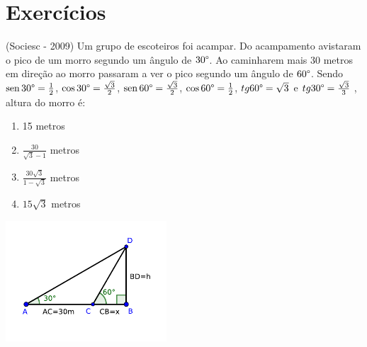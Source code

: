  \section{Exercícios}
 \begin{exer}
 (Sociesc - 2009) Um grupo de escoteiros foi acampar. Do acampamento avistaram o pico de um morro segundo um ângulo de $30 \degree$. Ao caminharem mais 30 metros em direção ao morro passaram a ver o pico segundo um ângulo de $60 \degree$. Sendo $\operatorname{sen} 30\degree = \frac{1}{2}$, $\cos 30\degree =\frac{\sqrt{3}}{2}$, $\operatorname{sen} 60\degree =\frac{\sqrt{3}}{2}$, $\cos 60\degree =\frac{1}{2}$, $tg 60\degree = \sqrt{3}$ e $tg 30\degree =\frac{\sqrt{3}}{3}$ , altura do morro é:
 \begin{multicols}{2}

 \begin{enumerate}
  \item 15 metros
  \item $\frac{30}{\sqrt{3}-1}$ metros
  \item $\frac{30\sqrt{3}}{1-\sqrt{3}}$ metros
  \item $15\sqrt{3}$ metros
 \end{enumerate}

 \includegraphics[width=6cm]{./cap_trigon/figs/tri_ret_exer}

 \end{multicols}
 \end{exer}
 
